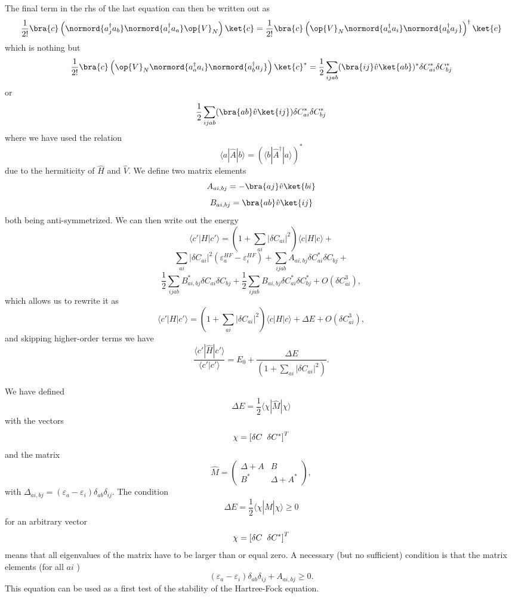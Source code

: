 The final term in the rhs of the last equation can then be written out as
    \[
\frac{1}{2!}\bra{c}\left(\normord{a^\dagger_j a_b} \normord{a^\dagger_i a_a} \op{V}_N  \right) \ket{c} = 
\frac{1}{2!}\bra{c}\left( \op{V}_N \normord{a^\dagger_a a_i} \normord{a^\dagger_b a_j} \right)^{\dagger} \ket{c}
\]
which is nothing but
\[
\frac{1}{2!}\bra{c}  \left( \op{V}_N \normord{a^\dagger_a a_i} \normord{a^\dagger_b a_j} \right) \ket{c}^*
=\frac{1}{2} \sum_{ijab} (\bra{ij}\hat{v}\ket{ab})^*\delta C_{ai}^*\delta C_{bj}^*
\]
or 
\[
\frac{1}{2} \sum_{ijab} (\bra{ab}\hat{v}\ket{ij})\delta C_{ai}^*\delta C_{bj}^*
\]
where we have used the relation
\[ \langle a |\hat{A} | b\rangle =  (\langle b |\hat{A}^{\dagger} | a\rangle)^*
\]
due to the hermiticity of $\hat{H}$ and $\hat{V}$.
We define two matrix elements
\[
A_{ai,bj}=-\bra{aj}\hat{v}\ket{bi}
\]
\[
B_{ai,bj}=\bra{ab}\hat{v}\ket{ij}
\]
both being anti-symmetrized.
We can then write out the energy
\[
\langle c'|H|c'\rangle = \left(1+\sum_{ai}|\delta C_{ai}|^2\right)\langle c |H|c\rangle+
\]
\[
\sum_{ai}|\delta C_{ai}|^2(\varepsilon_a^{HF}-\varepsilon_i^{HF})+\sum_{ijab}A_{ai,bj}\delta C_{ai}^*\delta C_{bj}+
\]
\[
\frac{1}{2} \sum_{ijab} B_{ai,bj}^*\delta C_{ai}\delta C_{bj}+\frac{1}{2} \sum_{ijab} B_{ai,bj}\delta C_{ai}^*\delta C_{bj}^*
+O(\delta C_{ai}^3),\]
which allows us to rewrite it as 
\[
\langle c'|H|c'\rangle = \left(1+\sum_{ai}|\delta C_{ai}|^2\right)\langle c |H|c\rangle+\Delta E+O(\delta C_{ai}^3),
\]
and skipping higher-order terms we have
\[
\frac{\langle c' |\hat{H} | c'\rangle}{\langle c' |c'\rangle} =E_0+\frac{\Delta E}{\left(1+\sum_{ai}|\delta C_{ai}|^2\right)}.
\]

We have defined 
\[
\Delta E = \frac{1}{2} \langle \chi | \hat{M}| \chi \rangle
\]
with the vectors 
\[ \chi = \left[ \delta C\hspace{0.2cm} \delta C^*\right]^T
\]
and the matrix 
\[
\hat{M}=\left(\begin{array}{cc} \Delta + A & B \\ B^* & \Delta + A^*\end{array}\right),
\]
with $\Delta_{ai,bj} = (\varepsilon_a-\varepsilon_i)\delta_{ab}\delta_{ij}$.
The condition
\[
\Delta E = \frac{1}{2} \langle \chi | \hat{M}| \chi \rangle \ge 0
\]
for an arbitrary  vector 
\[ \chi = \left[ \delta C\hspace{0.2cm} \delta C^*\right]^T\]
means that all eigenvalues of the matrix have to be larger than or equal zero. 
A necessary (but no sufficient) condition is that the matrix elements (for all $ai$ )
\[
(\varepsilon_a-\varepsilon_i)\delta_{ab}\delta_{ij}+A_{ai,bj} \ge 0.
\]
This equation can be used as a first test of the stability of the Hartree-Fock equation.


